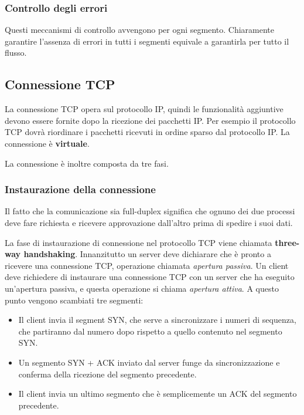         \subsubsection{Controllo degli errori}
            Questi meccanismi di controllo avvengono per ogni segmento. Chiaramente garantire l'assenza di errori in tutti i segmenti equivale a garantirla per tutto il flusso.
            
    \subsection{Connessione TCP}
        La connessione TCP opera sul protocollo IP, quindi le funzionalità aggiuntive devono essere fornite dopo la ricezione dei pacchetti IP. Per esempio il protocollo TCP dovrà riordinare i pacchetti ricevuti in ordine sparso dal protocollo IP. La connessione è \textbf{virtuale}.
        
        La connessione è inoltre composta da tre fasi.
        
        \subsubsection{Instaurazione della connessione}
            Il fatto che la comunicazione sia full-duplex significa che ognuno dei due processi deve fare richiesta e ricevere approvazione dall'altro prima di spedire i suoi dati.
            
            La fase di instaurazione di connessione nel protocollo TCP viene chiamata \textbf{three-way handshaking}. Innanzitutto un server deve dichiarare che è pronto a ricevere una connessione TCP, operazione chiamata \textit{apertura passiva}. Un client deve richiedere di instaurare una connessione TCP con un server che ha eseguito un'apertura passiva, e questa operazione si chiama \textit{apertura attiva}. A questo punto vengono scambiati tre segmenti:
            \begin{itemize}
                \item Il client invia il segment SYN, che serve a sincronizzare i numeri di sequenza, che partiranno dal numero dopo rispetto a quello contenuto nel segmento SYN.
                
                \item Un segmento SYN + ACK inviato dal server funge da sincronizzazione e conferma della ricezione del segmento precedente.
                
                \item Il client invia un ultimo segmento che è semplicemente un ACK del segmento precedente.
            \end{itemize}
            

